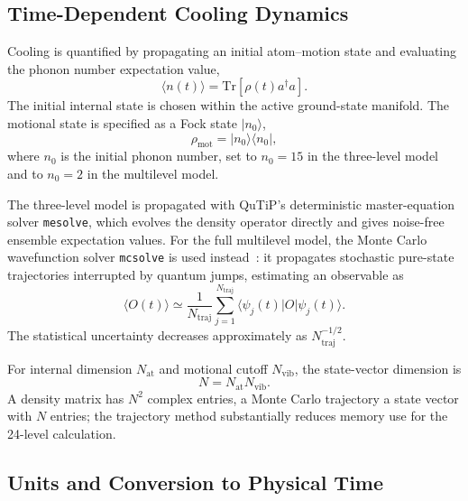 \subsection{Time-Dependent Cooling Dynamics}
\label{subsec:time_dynamics_numerical}

Cooling is quantified by propagating an initial atom--motion state and evaluating the phonon number expectation value,
\begin{equation}
    \langle n(t) \rangle
    =
    \mathrm{Tr}\left[\rho(t) a^\dagger a\right].
    \label{eq:n_expectation_numerical}
\end{equation}
The initial internal state is chosen within the active ground-state manifold. The motional state is specified as a Fock state $\lvert n_0\rangle$,
\begin{equation}
    \rho_{\mathrm{mot}}
    =
    \lvert n_0\rangle\langle n_0\rvert,
    \label{eq:initial_fock_state}
\end{equation}
where $n_0$ is the initial phonon number, set to $n_0=15$ in the three-level model and to $n_0=2$ in the multilevel model.

The three-level model is propagated with QuTiP's deterministic master-equation solver \texttt{mesolve}, which evolves the density operator directly and gives noise-free ensemble expectation values. For the full multilevel model, the Monte Carlo wavefunction solver \texttt{mcsolve} is used instead~\cite{Johansson2012}: it propagates stochastic pure-state trajectories interrupted by quantum jumps, estimating an observable as
\begin{equation}
    \langle O(t)\rangle
    \simeq
    \frac{1}{N_{\mathrm{traj}}}
    \sum_{j=1}^{N_{\mathrm{traj}}}
    \langle\psi_j(t)|O|\psi_j(t)\rangle.
    \label{eq:mc_average}
\end{equation}
The statistical uncertainty decreases approximately as $N_{\mathrm{traj}}^{-1/2}$.

For internal dimension $N_{\mathrm{at}}$ and motional cutoff $N_{\mathrm{vib}}$, the state-vector dimension is
\begin{equation}
    N=N_{\mathrm{at}}N_{\mathrm{vib}}.
\end{equation}
A density matrix has $N^2$ complex entries, a Monte Carlo trajectory a state vector with $N$ entries; the trajectory method substantially reduces memory use for the 24-level calculation.

\subsection{Units and Conversion to Physical Time}
\label{subsec:numerical_units}

